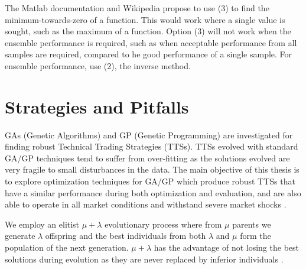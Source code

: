 The Matlab documentation and Wikipedia \cite{wikipediaMultiobjectiveoptimization2019} propose to use (3) to find the minimum-towards-zero of a function. This would work where a single value is sought, such as the maximum of a function.
Option (3) will not work when the ensemble performance is required, such as when acceptable performance from all samples are required, compared to he good performance of a single sample. For ensemble performance, use (2), the inverse method.




\section{Strategies and Pitfalls}

GAs (Genetic Algorithms) and GP (Genetic Programming) are investigated
for finding robust Technical Trading Strategies (TTSs). TTSs evolved with
standard GA/GP techniques tend to suffer from over-fitting as the solutions
evolved are very fragile to small disturbances in the data. The main objective
of this thesis is to explore optimization techniques for GA/GP which
produce robust TTSs that have a similar performance during both optimization
and evaluation, and are also able to operate in all market conditions
and withstand severe market shocks \cite{Lindquist2017}.




We employ an elitist $\mu + \lambda$ evolutionary process where from $\mu$ parents we
generate $\lambda$ offspring and the best individuals from both $\lambda$ and $\mu$ form the
population of the next generation.  $\mu + \lambda$ has the advantage of not losing
the best solutions during evolution as they are never replaced by inferior
individuals \cite{Lindquist2017}.


